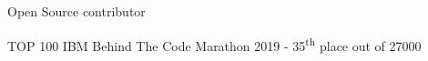 Open Source contributor	\hfill

TOP 100 IBM Behind The Code Marathon 2019 - 35\textsuperscript{th} place out of 27000

